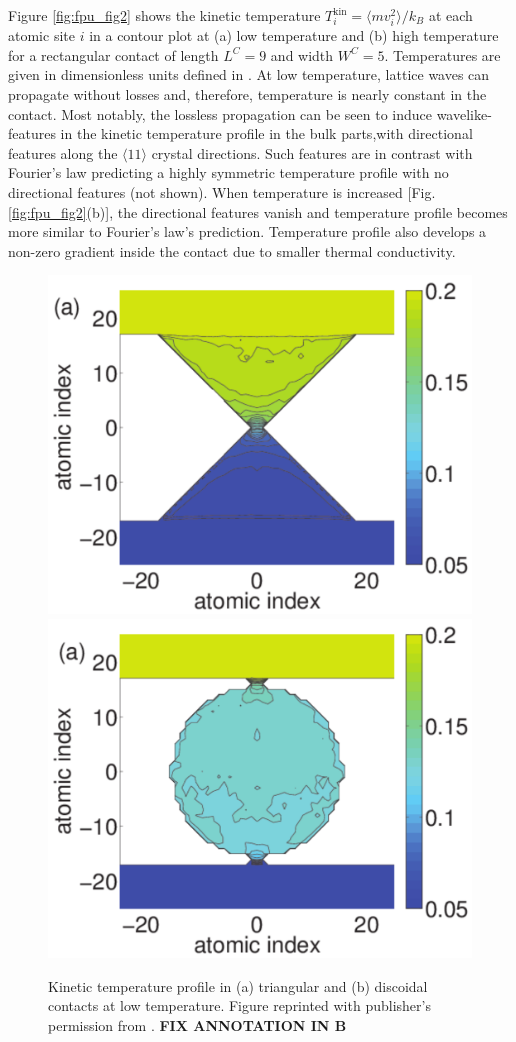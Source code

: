 Figure \ref{fig:fpu_fig2} shows the kinetic temperature $T_i^{\textrm{kin}}=\langle mv_i^2 \rangle/k_B$ at each atomic site $i$ in a contour plot at (a) low temperature and (b) high temperature for a rectangular contact of length $L^C=9$ and width $W^C=5$. Temperatures are given in dimensionless units defined in . At low temperature, lattice waves can propagate without losses and, therefore, temperature is nearly constant in the contact. Most notably, the lossless propagation can be seen to induce wavelike-features in the kinetic temperature profile in the bulk parts,with directional features along the $\langle 11 \rangle$ crystal directions. Such features are in contrast with Fourier's law predicting a highly symmetric temperature profile with no directional features (not shown). When temperature is increased [Fig. \ref{fig:fpu_fig2}(b)], the directional features vanish and temperature profile becomes more similar to Fourier's law's prediction. Temperature profile also develops a non-zero gradient inside the contact due to smaller thermal conductivity.


\begin{figure}
\begin{center}
 \includegraphics[width=.49\columnwidth]{pics/aip_fig5a.pdf}
 \includegraphics[width=.49\columnwidth]{pics/aip_fig6a.pdf}
 \caption{Kinetic temperature profile in (a) triangular and (b) discoidal contacts at low temperature. Figure reprinted with publisher's permission from . \textbf{FIX ANNOTATION IN B}}
\label{fig:aip_figs56}
\end{center}
\end{figure}

